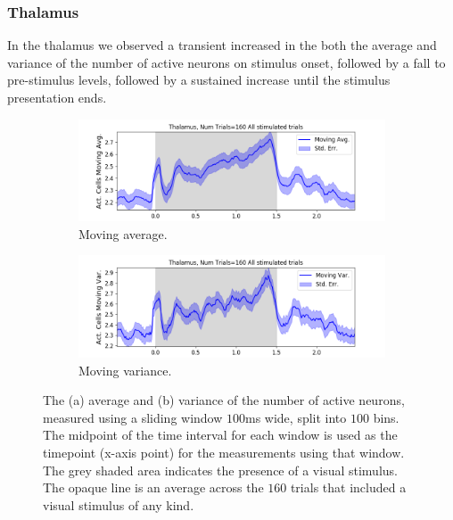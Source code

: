 \documentclass[a4paper,12pt]{article}
\theoremstyle{definition}
\begin{document}
    \newpage

    \subsubsection{Thalamus}
    In the thalamus we observed a transient increased in the both the average and variance of the number of active neurons on stimulus onset, followed by a fall to pre-stimulus levels, followed by a sustained increase until the stimulus presentation ends.

    \begin{figure}[h]
      \begin{subfigure}[h]{\linewidth}
        \includegraphics[width=\linewidth]{figures/thalamus_1ms_moving_avg_all_stimulated_trials.png}
        \caption{Moving average.}
        \label{fig:thalamus_moving_avg_num_active_cells}
      \end{subfigure}
      \begin{subfigure}[h]{\linewidth}
        \includegraphics[width=\linewidth]{figures/thalamus_1ms_moving_var_all_stimulated_trials.png}
        \caption{Moving variance.}
        \label{fig:thalamus_moving_var_num_active_cells}
      \end{subfigure}
      \caption{The (a) average and (b) variance of the number of active neurons, measured using a sliding window $100$ms wide, split into $100$ bins. The midpoint of the time interval for each window is used as the timepoint (x-axis point) for the measurements using that window. The grey shaded area indicates the presence of a visual stimulus. The opaque line is an average across the $160$ trials that included a visual stimulus of any kind.}
      \label{fig:thalamus_moving_avg_and_var}
    \end{figure}
\end{document}
